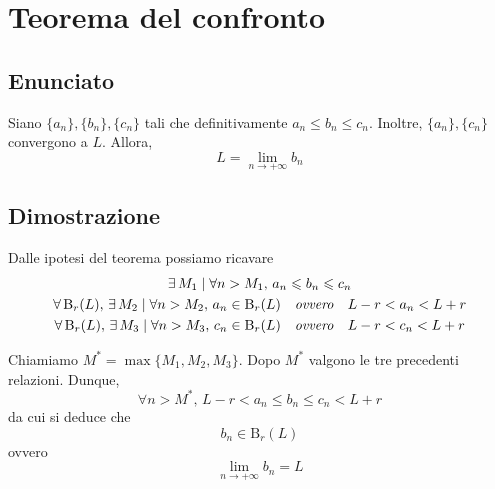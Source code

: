 \documentclass[../../dimostrazioni]{subfiles}
\begin{document}
    \chapter{Teorema del confronto}

        \section*{Enunciato}

            Siano \(\{a_n\}, \{b_n\}, \{c_n\}\) tali che definitivamente \(a_n \leqslant b_n \leqslant c_n\).
            Inoltre, \(\{a_n\}, \{c_n\}\) convergono a \(L\). Allora,
            \[
                L = \lim_{n \to +\infty} b_n
            \]

        \section*{Dimostrazione}

            Dalle ipotesi del teorema possiamo ricavare
            \begin{gather*}
                \exists \, M_1 \; | \; \forall n > M_1, \, a_n \leqslant b_n \leqslant c_n\\
                \forall \, \mathrm{B}_r (L), \, \exists \, M_2 \; | \; \forall n > M_2, \, a_n \in \mathrm{B}_r (L) \quad \text{\emph{ovvero}} \quad L - r < a_n < L + r\\
                \forall \, \mathrm{B}_r (L), \, \exists \, M_3 \; | \; \forall n > M_3, \, c_n \in \mathrm{B}_r (L) \quad \text{\emph{ovvero}} \quad L - r < c_n < L + r
            \end{gather*}

            Chiamiamo \(M^* = \max\{M_1, M_2, M_3\}\). Dopo \(M^*\) valgono le tre precedenti relazioni. Dunque,
            \[
                \forall n > M^*, \, L - r < a_n \leqslant b_n \leqslant c_n < L + r
            \]
            da cui si deduce che
            \[
                b_n \in \mathrm{B}_r (L)
            \]
            ovvero
            \[
                \lim_{n \to +\infty} b_n = L
            \]
    
\end{document}
